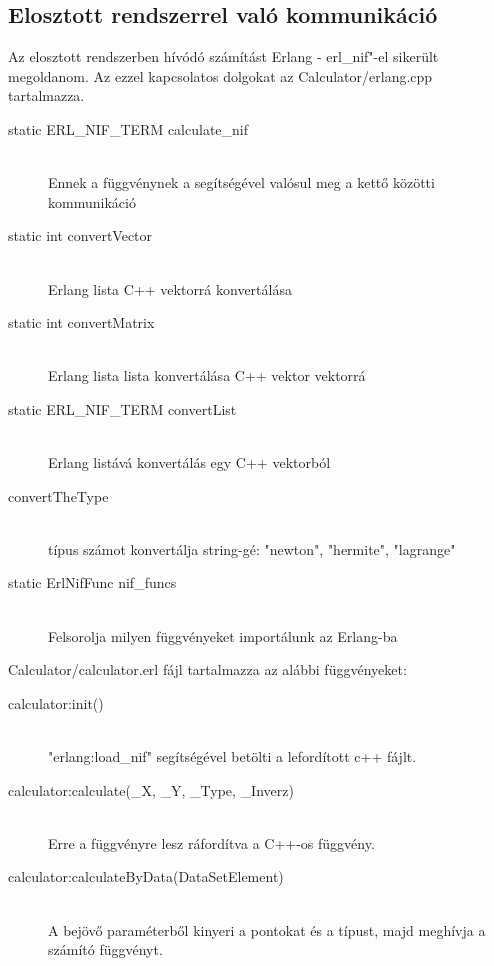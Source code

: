 \subsection{Elosztott rendszerrel való kommunikáció}
	Az elosztott rendszerben hívódó számítást Erlang - erl\_nif"-el sikerült megoldanom. 
	Az ezzel kapcsolatos dolgokat az Calculator/erlang.cpp tartalmazza.
	\begin{description}
		\item[static ERL\_NIF\_TERM calculate\_nif] \hfill \\
		Ennek a függvénynek a segítségével valósul meg a kettő közötti kommunikáció
		\item[static int convertVector] \hfill \\
		Erlang lista C++ vektorrá konvertálása
		\item[static int convertMatrix] \hfill \\
		Erlang lista lista konvertálása C++ vektor vektorrá
		\item[static ERL\_NIF\_TERM convertList] \hfill \\
		Erlang listává konvertálás egy C++ vektorból
		\item[convertTheType] \hfill \\
			típus számot konvertálja string-gé: 
			"newton", "hermite", "lagrange"
		\item[static ErlNifFunc nif\_funcs] \hfill \\
			Felsorolja milyen függvényeket importálunk az Erlang-ba
	\end{description}
	Calculator/calculator.erl fájl tartalmazza az alábbi függvényeket: 
	\begin{description}
		\item[calculator:init()] \hfill \\
			"erlang:load\_nif" segítségével betölti a lefordított c++ fájlt.
		\item[calculator:calculate(\_X, \_Y, \_Type, \_Inverz)] \hfill \\
			Erre a függvényre lesz ráfordítva a C++-os függvény.
		\item[calculator:calculateByData(DataSetElement)] \hfill \\
		A bejövő paraméterből kinyeri a pontokat és a típust, majd meghívja a számító függvényt.
	\end{description}